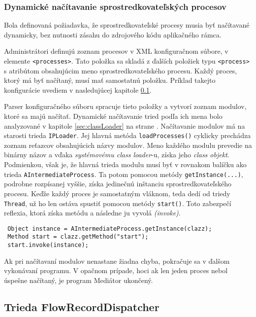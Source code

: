 \subsubsection{Dynamické načítavanie sprostredkovateľských procesov} \label{sec:intermediate_load}

Bola definovaná požiadavka, že sprostredkovateľské procesy musia byť načítavané dynamicky, bez nutnosti
zásahu do zdrojového kódu aplikačného rámca. 

Administrátori definujú zoznam procesov v XML konfiguračnom súbore, v elemente \verb|<processes>|. 
Tato položka sa skladá z ďalších položiek typu \verb|<process>| s atribútom 
obsahujúcim meno sprostredkovateľského procesu. Každý proces, ktorý má byť načítaný, musí mať 
samostatnú položku. Príklad takejto konfigurácie uvediem v nasledujúcej kapitole \ref{sec:FlowRecordDispatcher}.

Parser konfiguračného súboru spracuje tieto položky a vytvorí zoznam modulov, ktoré sa majú načítať.
Dynamické načítavanie tried podľa ich mena bolo analyzované v kapitole \ref{sec:classLoader} na strane
\pageref{sec:classLoader}. Načítavanie modulov má na starosti trieda \verb|IPLoader|. Jej hlavná metóda
\verb|loadProcesses()| cyklicky prechádza zoznam reťazcov obsahujúcich názvy modulov. Meno každého 
modulu prevedie na binárny názov a vďaka \emph{systémovému class loader}-u, získa jeho 
\emph{class objekt}. Podmienkou, však je, že hlavná trieda modulu musí byť v rovnakom balíčku ako trieda
\verb|AIntermediateProcess|. Ta potom pomocou metódy \verb|getInstance(...)|, podrobne rozpísanej vyššie, 
získa jedinečnú inštanciu sprostredkovateľského procesu. Keďže každý proces je samostatným vláknom, teda 
dedí od triedy \verb|Thread|, už ho len ostáva spustiť pomocou metódy \verb|start()|. Toto zabezpečí 
reflexia, ktorá získa metódu a následne ju vyvolá \emph{(invoke)}.
\begin{verbatim}
 Object instance = AIntermediateProcess.getInstance(clazz);
 Method start = clazz.getMethod("start");
 start.invoke(instance);
\end{verbatim}

Ak pri načítavaní modulov nenastane žiadna chyba, pokračuje sa v ďalšom vykonávaní programu. V opačnom 
prípade, hoci ak len jeden proces nebol úspešne načítaný, je program Mediátor ukončený.




\subsection{Trieda FlowRecordDispatcher} \label{sec:FlowRecordDispatcher}

